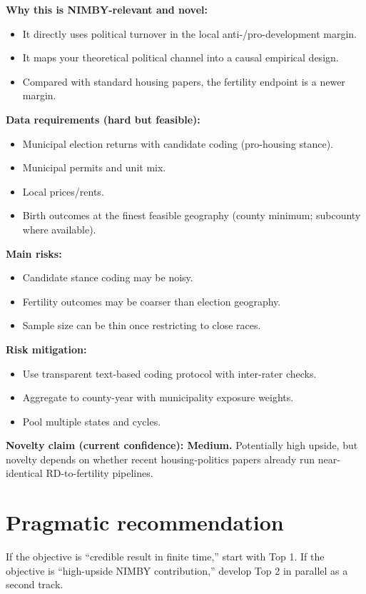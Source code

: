 \documentclass[11pt]{article}
\begin{document}
\textbf{Why this is NIMBY-relevant and novel:}
\begin{itemize}
\item It directly uses political turnover in the local anti-/pro-development margin.
\item It maps your theoretical political channel into a causal empirical design.
\item Compared with standard housing papers, the fertility endpoint is a newer margin.
\end{itemize}

\textbf{Data requirements (hard but feasible):}
\begin{itemize}
\item Municipal election returns with candidate coding (pro-housing stance).
\item Municipal permits and unit mix.
\item Local prices/rents.
\item Birth outcomes at the finest feasible geography (county minimum; subcounty where available).
\end{itemize}

\textbf{Main risks:}
\begin{itemize}
\item Candidate stance coding may be noisy.
\item Fertility outcomes may be coarser than election geography.
\item Sample size can be thin once restricting to close races.
\end{itemize}

\textbf{Risk mitigation:}
\begin{itemize}
\item Use transparent text-based coding protocol with inter-rater checks.
\item Aggregate to county-year with municipality exposure weights.
\item Pool multiple states and cycles.
\end{itemize}

\textbf{Novelty claim (current confidence): Medium.}
Potentially high upside, but novelty depends on whether recent housing-politics papers already run near-identical RD-to-fertility pipelines.

\section{Pragmatic recommendation}
If the objective is ``credible result in finite time,'' start with Top 1.
If the objective is ``high-upside NIMBY contribution,'' develop Top 2 in parallel as a second track.
\end{document}
